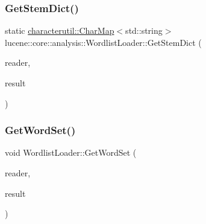 \mbox{\label{classlucene_1_1core_1_1analysis_1_1WordlistLoader_abefbb47cbb9b31c92d4f4b0a55f7f258}} 
\subsubsection{\texorpdfstring{Get\+Stem\+Dict()}{GetStemDict()}}
{\footnotesize\ttfamily static \mbox{\hyperlink{classlucene_1_1core_1_1analysis_1_1characterutil_1_1CharMap}{characterutil\+::\+Char\+Map}}$<$std\+::string$>$ lucene\+::core\+::analysis\+::\+Wordlist\+Loader\+::\+Get\+Stem\+Dict (\begin{DoxyParamCaption}\item[{\mbox{\hyperlink{classlucene_1_1core_1_1analysis_1_1Reader}{Reader}} \&}]{reader,  }\item[{\mbox{\hyperlink{classlucene_1_1core_1_1analysis_1_1characterutil_1_1CharMap}{characterutil\+::\+Char\+Map}}$<$ std\+::string $>$ \&}]{result }\end{DoxyParamCaption})\hspace{0.3cm}{\ttfamily [static]}}

\mbox{\label{classlucene_1_1core_1_1analysis_1_1WordlistLoader_a24b538126a425f139dcec46732bf247c}} 
\subsubsection{\texorpdfstring{Get\+Word\+Set()}{GetWordSet()}\hspace{0.1cm}{\footnotesize\ttfamily [1/4]}}
{\footnotesize\ttfamily void Wordlist\+Loader\+::\+Get\+Word\+Set (\begin{DoxyParamCaption}\item[{\mbox{\hyperlink{classlucene_1_1core_1_1analysis_1_1Reader}{Reader}} \&}]{reader,  }\item[{\mbox{\hyperlink{classlucene_1_1core_1_1analysis_1_1characterutil_1_1CharSet}{characterutil\+::\+Char\+Set}} \&}]{result }\end{DoxyParamCaption})\hspace{0.3cm}{\ttfamily [static]}}

